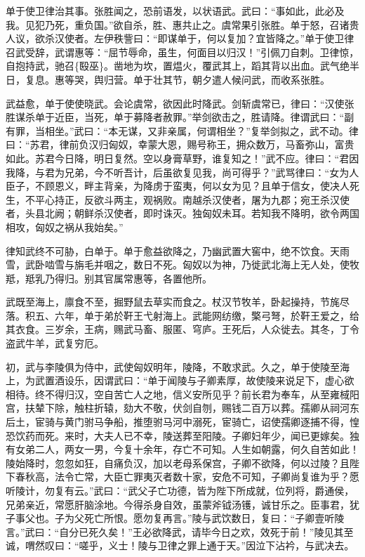 \documentclass[]{article}
\begin{document}
单于使卫律治其事。张胜闻之，恐前语发，以状语武。武曰：``事如此，此必及我。见犯乃死，重负国。''欲自杀，胜、惠共止之。虞常果引张胜。单于怒，召诸贵人议，欲杀汉使者。左伊秩訾曰：``即谋单于，何以复加？宜皆降之。''单于使卫律召武受辞，武谓惠等：``屈节辱命，虽生，何面目以归汉！''引佩刀自刺。卫律惊，自抱持武，驰召\{殹巫\}。凿地为坎，置煴火，覆武其上，蹈其背以出血。武气绝半日，复息。惠等哭，舆归营。单于壮其节，朝夕遣人候问武，而收系张胜。

武益愈，单于使使晓武。会论虞常，欲因此时降武。剑斩虞常已，律曰：``汉使张胜谋杀单于近臣，当死，单于募降者赦罪。''举剑欲击之，胜请降。律谓武曰：``副有罪，当相坐。''武曰：``本无谋，又非亲属，何谓相坐？''复举剑拟之，武不动。律曰：``苏君，律前负汉归匈奴，幸蒙大恩，赐号称王，拥众数万，马畜弥山，富贵如此。苏君今日降，明日复然。空以身膏草野，谁复知之！''武不应。律曰：``君因我降，与君为兄弟，今不听吾计，后虽欲复见我，尚可得乎？''武骂律曰：``女为人臣子，不顾恩义，畔主背亲，为降虏于蛮夷，何以女为见？且单于信女，使决人死生，不平心持正，反欲斗两主，观祸败。南越杀汉使者，屠为九郡；宛王杀汉使者，头县北阙；朝鲜杀汉使者，即时诛灭。独匈奴未耳。若知我不降明，欲令两国相攻，匈奴之祸从我始矣。''

律知武终不可胁，白单于。单于愈益欲降之，乃幽武置大窖中，绝不饮食。天雨雪，武卧啮雪与旃毛并咽之，数日不死。匈奴以为神，乃徙武北海上无人处，使牧羝，羝乳乃得归。别其官属常惠等，各置他所。

武既至海上，廪食不至，掘野鼠去草实而食之。杖汉节牧羊，卧起操持，节旄尽落。积五、六年，单于弟於靬王弋射海上。武能网纺缴，檠弓弩，於靬王爱之，给其衣食。三岁余，王病，赐武马畜、服匿、穹庐。王死后，人众徙去。其冬，丁令盗武牛羊，武复穷厄。

初，武与李陵俱为侍中，武使匈奴明年，陵降，不敢求武。久之，单于使陵至海上，为武置酒设乐，因谓武曰：``单于闻陵与子卿素厚，故使陵来说足下，虚心欲相待。终不得归汉，空自苦亡人之地，信义安所见乎？前长君为奉车，从至雍棫阳宫，扶辇下除，触柱折辕，劾大不敬，伏剑自刎，赐钱二百万以葬。孺卿从祠河东后土，宦骑与黄门驸马争船，推堕驸马河中溺死，宦骑亡，诏使孺卿逐捕不得，惶恐饮药而死。来时，大夫人已不幸，陵送葬至阳陵。子卿妇年少，闻已更嫁矣。独有女弟二人，两女一男，今复十余年，存亡不可知。人生如朝露，何久自苦如此！陵始降时，忽忽如狂，自痛负汉，加以老母系保宫，子卿不欲降，何以过陵？且陛下春秋高，法令亡常，大臣亡罪夷灭者数十家，安危不可知，子卿尚复谁为乎？愿听陵计，勿复有云。''武曰：``武父子亡功德，皆为陛下所成就，位列将，爵通侯，兄弟亲近，常愿肝脑涂地。今得杀身自效，虽蒙斧钺汤镬，诚甘乐之。臣事君，犹子事父也。子为父死亡所恨。愿勿复再言。''陵与武饮数日，复曰：``子卿壹听陵言。''武曰：``自分已死久矣！''王必欲降武，请毕今日之欢，效死于前！''陵见其至诚，喟然叹曰：``嗟乎，义士！陵与卫律之罪上通于天。''因泣下沾衿，与武决去。
\end{document}

